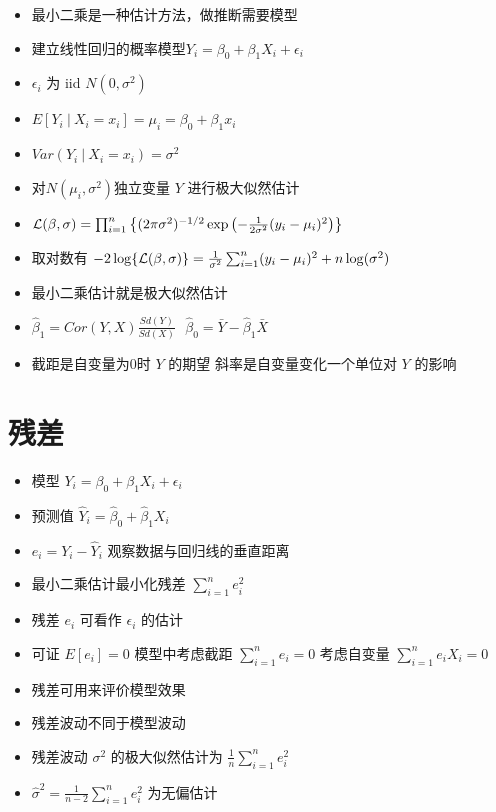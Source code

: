\documentclass[]{book}
\providecommand{\tightlist}{%
  \setlength{\itemsep}{0pt}\setlength{\parskip}{0pt}}
\begin{document}
\begin{itemize}
\tightlist
\item
  最小二乘是一种估计方法，做推断需要模型
\item
  建立线性回归的概率模型\(Y_i = \beta_0 + \beta_1 X_i + \epsilon_{i}\)
\item
  \(\epsilon_{i}\) 为 iid \(N(0, \sigma^2)\)
\item
  \(E[Y_i ~|~ X_i = x_i] = \mu_i = \beta_0 + \beta_1 x_i\)
\item
  \(Var(Y_i ~|~ X_i = x_i) = \sigma^2\)
\item
  对\(N(\mu_i, \sigma^2)\)独立变量 \(Y\) 进行极大似然估计
\item
  \({\cal L}(\beta, \sigma) = \prod_{i=1}^n \left\{(2 \pi \sigma^2)^{-1/2}\exp\left(-\frac{1}{2\sigma^2}(y_i - \mu_i)^2 \right) \right\}\)
\item
  取对数有 \(-2 \log\{ {\cal L}(\beta, \sigma) \} = \frac{1}{\sigma^2} \sum_{i=1}^n (y_i - \mu_i)^2 + n\log(\sigma^2)\)
\item
  最小二乘估计就是极大似然估计
\item
  \(\hat \beta_1 = Cor(Y, X) \frac{Sd(Y)}{Sd(X)} ~~~ \hat \beta_0 = \bar Y - \hat \beta_1 \bar X\)
\item
  截距是自变量为0时 \(Y\) 的期望 斜率是自变量变化一个单位对 \(Y\) 的影响
\end{itemize}

\hypertarget{ux6b8bux5dee}{%
\section{残差}\label{ux6b8bux5dee}}

\begin{itemize}
\tightlist
\item
  模型 \(Y_i = \beta_0 + \beta_1 X_i + \epsilon_i\)
\item
  预测值 \(\hat Y_i = \hat \beta_0 + \hat \beta_1 X_i\)
\item
  \(e_i = Y_i - \hat Y_i\) 观察数据与回归线的垂直距离
\item
  最小二乘估计最小化残差 \(\sum_{i=1}^n e_i^2\)
\item
  残差 \(e_i\) 可看作 \(\epsilon_i\) 的估计
\item
  可证 \(E[e_i] = 0\) 模型中考虑截距 \(\sum_{i=1}^n e_i = 0\) 考虑自变量 \(\sum_{i=1}^n e_i X_i = 0\)
\item
  残差可用来评价模型效果
\item
  残差波动不同于模型波动
\item
  残差波动 \(\sigma^2\) 的极大似然估计为 \(\frac{1}{n}\sum_{i=1}^n e_i^2\)
\item
  \(\hat \sigma^2 = \frac{1}{n-2}\sum_{i=1}^n e_i^2\) 为无偏估计
\end{itemize}
\end{document}
